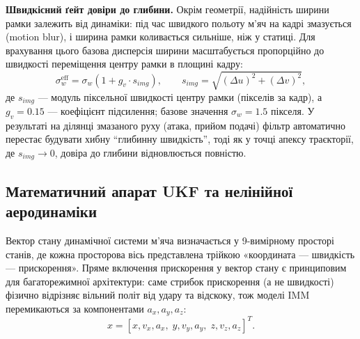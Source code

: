 \textbf{Швидкісний ґейт довіри до глибини.} Окрім геометрії, надійність ширини
рамки залежить від динаміки: під час швидкого польоту м'яч на кадрі змазується
(motion blur), і ширина рамки коливається сильніше, ніж у статиці. Для
врахування цього базова дисперсія ширини масштабується пропорційно до швидкості
переміщення центру рамки в площині кадру:
\begin{equation}\sigma_w^{\text{eff}} = \sigma_w \left(1 + g_v \cdot s_{img}\right),\qquad
s_{img} = \sqrt{(\Delta u)^2 + (\Delta v)^2},\end{equation}
де $s_{img}$ --- модуль піксельної швидкості центру рамки (пікселів за кадр), а
$g_v = 0.15$ --- коефіцієнт підсилення; базове значення $\sigma_w = 1.5$ пікселя.
У результаті на ділянці змазаного руху (атака, прийом подачі) фільтр автоматично
перестає будувати хибну ``глибинну швидкість'', тоді як у точці апексу
траєкторії, де $s_{img} \to 0$, довіра до глибини відновлюється повністю.

\subsection{Математичний апарат \gls{UKF} та нелінійної аеродинаміки}

Вектор стану динамічної системи м'яча визначається у 9-вимірному просторі
станів, де кожна просторова вісь представлена трійкою «координата --- швидкість
--- прискорення». Пряме включення прискорення у вектор стану є принциповим для
багаторежимної архітектури: саме стрибок прискорення (а не швидкості) фізично
відрізняє вільний політ від удару та відскоку, тож моделі \gls{IMM}
перемикаються за компонентами $a_x, a_y, a_z$:
\begin{equation}x = [x, v_{x}, a_{x},\; y, v_{y}, a_{y},\; z, v_{z}, a_{z}]^{T}.\end{equation}

